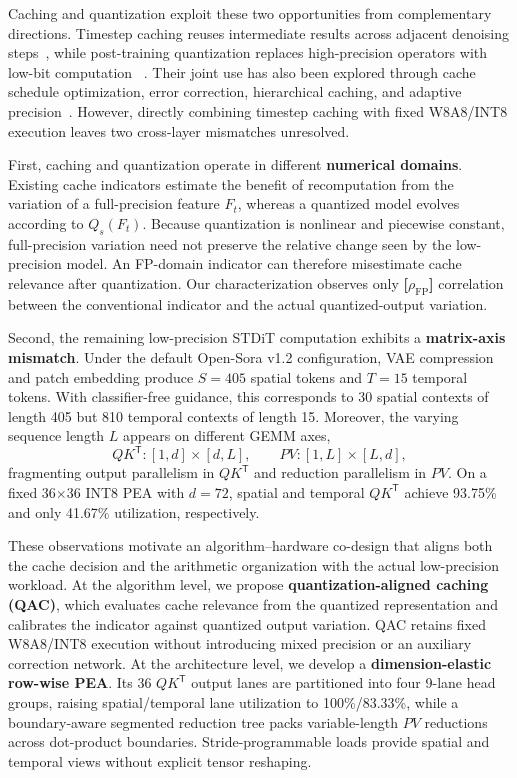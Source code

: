 \documentclass[conference]{IEEEtran}
\newcommand{\ModelName}{Open-Sora v1.2}
\newcommand{\SpatialSeq}{405}
\newcommand{\TemporalSeq}{15}
\newcommand{\SpatialContexts}{30}
\newcommand{\TemporalContexts}{810}
\newcommand{\BaseSpatialQKUtil}{93.75\%}
\newcommand{\OursSpatialQKUtil}{100\%}
\newcommand{\BaseTemporalQKUtil}{41.67\%}
\newcommand{\OursTemporalQKUtil}{83.33\%}
\newcommand{\FPIndicatorCorr}{\textbf{[$\rho_{\mathrm{FP}}$]}}
\begin{document}
Caching and quantization exploit these two opportunities from complementary
directions. Timestep caching reuses intermediate results across adjacent
denoising steps~\cite{liu2025teacache}, while post-training quantization
replaces high-precision operators with low-bit computation
~\cite{zhao2025viditq}. Their joint use has also been explored through cache
schedule optimization, error correction, hierarchical caching, and adaptive
precision~\cite{liu2025cachequant,wu2025quantcache}. However, directly
combining timestep caching with fixed W8A8/INT8 execution leaves two
cross-layer mismatches unresolved.

First, caching and quantization operate in different \textbf{numerical
domains}. Existing cache indicators estimate the benefit of recomputation
from the variation of a full-precision feature $F_t$, whereas a quantized
model evolves according to $Q_s(F_t)$. Because quantization is nonlinear and
piecewise constant, full-precision variation need not preserve the relative
change seen by the low-precision model. An FP-domain indicator can therefore
misestimate cache relevance after quantization. Our characterization observes
only \FPIndicatorCorr{} correlation between the conventional indicator and
the actual quantized-output variation.

Second, the remaining low-precision STDiT computation exhibits a
\textbf{matrix-axis mismatch}. Under the default \ModelName{} configuration,
VAE compression and patch embedding produce $S=\SpatialSeq{}$ spatial tokens
and $T=\TemporalSeq{}$ temporal tokens. With classifier-free guidance, this
corresponds to \SpatialContexts{} spatial contexts of length \SpatialSeq{}
but \TemporalContexts{} temporal contexts of length \TemporalSeq{}. Moreover,
the varying sequence length $L$ appears on different GEMM axes,
\begin{equation}
QK^{\mathsf T}:[1,d]\!\times\![d,L],\qquad
PV:[1,L]\!\times\![L,d],
\label{eq:attn_axes}
\end{equation}
fragmenting output parallelism in $QK^{\mathsf T}$ and reduction parallelism
in $PV$. On a fixed 36$\times$36 INT8 PEA with $d=72$, spatial and temporal
$QK^{\mathsf T}$ achieve \BaseSpatialQKUtil{} and only
\BaseTemporalQKUtil{} utilization, respectively.

These observations motivate an algorithm--hardware co-design that aligns both
the cache decision and the arithmetic organization with the actual
low-precision workload. At the algorithm level, we propose
\textbf{quantization-aligned caching (QAC)}, which evaluates cache relevance
from the quantized representation and calibrates the indicator against
quantized output variation. QAC retains fixed W8A8/INT8 execution without introducing
mixed precision or an auxiliary correction network. At the architecture
level, we develop a \textbf{dimension-elastic row-wise PEA}. Its 36
$QK^{\mathsf T}$ output lanes are partitioned into four 9-lane head groups,
raising spatial/temporal lane utilization to
\OursSpatialQKUtil{}/\OursTemporalQKUtil{}, while a boundary-aware segmented
reduction tree packs variable-length $PV$ reductions across dot-product
boundaries. Stride-programmable loads provide spatial and temporal views
without explicit tensor reshaping.
\end{document}
